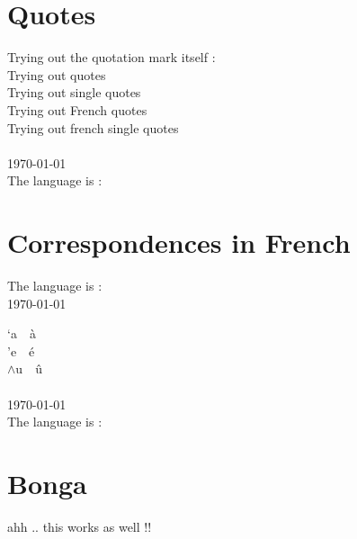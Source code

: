 \documentclass{article}
\begin{document}
\section{Quotes}
\noindent
Trying out the quotation mark itself : \dq\\
\glqq Trying out quotes \grqq\\
\glq Trying out single quotes \grq\\
\flqq Trying out French quotes \frqq\\
\flq Trying out french single quotes \frq\\

\\
\today\\
The language is : 

\section{Correspondences in French}
The language is : \\
\today\\
\newcommand{\LS}[1]{`#1~~\`#1}
\newcommand{\RS}[1]{'#1~~\'#1}
\newcommand{\HAT}[1]{$\wedge$#1~~\^#1}

\LS{a}\\
\RS{e}\\
\HAT{u}\\

\\
\today\\
The language is : 

\appendix

\section{Bonga}
ahh .. this works as well !!

\printindex
\end{document}
